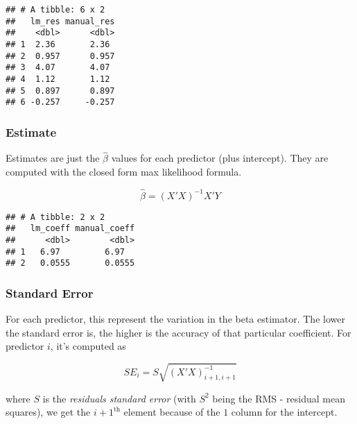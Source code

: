 \documentclass[
  oneside]{book}
\newenvironment{Shaded}{\begin{snugshade}}{\end{snugshade}}
\newcommand{\AttributeTok}[1]{\textcolor[rgb]{0.77,0.63,0.00}{#1}}
\newcommand{\FunctionTok}[1]{\textcolor[rgb]{0.00,0.00,0.00}{#1}}
\newcommand{\NormalTok}[1]{#1}
\newcommand{\OtherTok}[1]{\textcolor[rgb]{0.56,0.35,0.01}{#1}}
\newcommand{\SpecialCharTok}[1]{\textcolor[rgb]{0.00,0.00,0.00}{#1}}
\begin{document}
\begin{verbatim}
## # A tibble: 6 x 2
##   lm_res manual_res
##    <dbl>      <dbl>
## 1  2.36       2.36 
## 2  0.957      0.957
## 3  4.07       4.07 
## 4  1.12       1.12 
## 5  0.897      0.897
## 6 -0.257     -0.257
\end{verbatim}

\hypertarget{estimate}{%
\subsubsection{Estimate}\label{estimate}}

Estimates are just the \(\hat\beta\) values for each predictor (plus intercept).
They are computed with the closed form max likelihood formula.

\[
\hat\beta = (X'X)^{-1}X'Y
\]

\begin{Shaded}
\end{Shaded}

\begin{verbatim}
## # A tibble: 2 x 2
##   lm_coeff manual_coeff
##      <dbl>        <dbl>
## 1   6.97         6.97  
## 2   0.0555       0.0555
\end{verbatim}

\hypertarget{standard-error}{%
\subsubsection{Standard Error}\label{standard-error}}

For each predictor, this represent the variation in the beta estimator. The lower
the standard error is, the higher is the accuracy of that particular coefficient.
For predictor \(i\), it's computed as

\[
SE_i = S \sqrt{(X'X)^{-1}_{i+1,i+1}}
\]

where \(S\) is the \emph{residuals standard error} (with \(S^2\) being the RMS - residual
mean squares), we get the \(i+1^{\text{th}}\) element because of the \(1\) column for the intercept.
\end{document}
